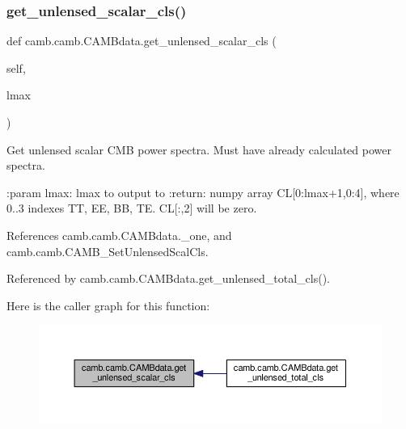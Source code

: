 \subsubsection{\texorpdfstring{get\+\_\+unlensed\+\_\+scalar\+\_\+cls()}{get\_unlensed\_scalar\_cls()}}
{\footnotesize\ttfamily def camb.\+camb.\+C\+A\+M\+Bdata.\+get\+\_\+unlensed\+\_\+scalar\+\_\+cls (\begin{DoxyParamCaption}\item[{}]{self,  }\item[{}]{lmax }\end{DoxyParamCaption})}

\begin{DoxyVerb}Get unlensed scalar CMB power spectra. Must have already calculated power spectra.

:param lmax: lmax to output to
:return: numpy array CL[0:lmax+1,0:4], where 0..3 indexes TT, EE, BB, TE. CL[:,2] will be zero.
\end{DoxyVerb}
 

References camb.\+camb.\+C\+A\+M\+Bdata.\+\_\+one, and camb.\+camb.\+C\+A\+M\+B\+\_\+\+Set\+Unlensed\+Scal\+Cls.



Referenced by camb.\+camb.\+C\+A\+M\+Bdata.\+get\+\_\+unlensed\+\_\+total\+\_\+cls().

Here is the caller graph for this function\+:
\nopagebreak
\begin{figure}[H]
\begin{center}
\leavevmode
\includegraphics[width=350pt]{classcamb_1_1camb_1_1CAMBdata_a43faed309e32f7e4c075c0f8be5bcab8_icgraph}
\end{center}
\end{figure}
\mbox{\label{classcamb_1_1camb_1_1CAMBdata_a44fa4354fe9d41ca6b275e078c17d983}} 
